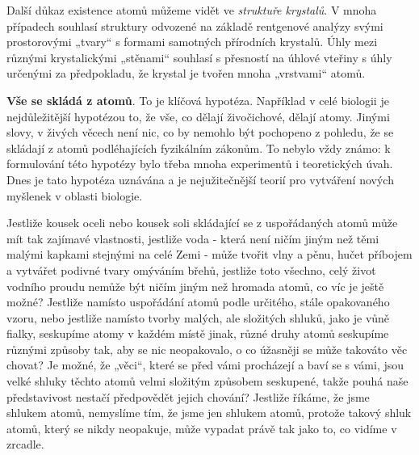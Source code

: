     Další důkaz existence atomů můžeme vidět ve \emph{struktuře krystalů}. V mnoha případech
    souhlasí struktury odvozené na základě rentgenové analýzy svými prostorovými „tvary“ s formami
    samotných přírodních krystalů. Úhly mezi různými krystalickými „stěnami“ souhlasí s přesností na
    úhlové vteřiny s úhly určenými za předpokladu, že krystal je tvořen mnoha „vrstvami“ atomů.
    
    \textbf{Vše se skládá z atomů}. To je klíčová hypotéza. Například v celé biologii je
    nejdůležitější hypotézou to, že vše, co dělají živočichové, dělají atomy. Jinými slovy, v živých
    věcech není nic, co by nemohlo být pochopeno z pohledu, že se skládají z atomů podléhajících
    fyzikálním zákonům. To nebylo vždy známo: k formulování této hypotézy bylo třeba mnoha
    experimentů i teoretických úvah. Dnes je tato hypotéza uznávána a je nejužitečnější teorií pro
    vytváření nových myšlenek v oblasti biologie.
    
    Jestliže kousek oceli nebo kousek soli skládající se z uspořádaných atomů může mít tak zajímavé
    vlastnosti, jestliže voda - která není ničím jiným než těmi malými kapkami stejnými na celé Zemi
    - může tvořit vlny a pěnu, hučet příbojem a vytvářet podivné tvary omýváním břehů, jestliže toto
    všechno, celý život vodního proudu nemůže být ničím jiným než hromada atomů, co víc je ještě
    možné? Jestliže namísto uspořádání atomů podle určitého, stále opakovaného vzoru, nebo jestliže
    namísto tvorby malých, ale složitých shluků, jako je vůně fialky, seskupíme atomy v každém místě
    jinak, různé druhy atomů seskupíme různými způsoby tak, aby se nic neopakovalo, o co úžasněji se
    může takováto věc chovat? Je možné, že „věci“, které se před vámi procházejí a baví se s vámi,
    jsou velké shluky těchto atomů velmi složitým způsobem seskupené, takže pouhá naše představivost
    nestačí předpovědět jejich chování? Jestliže říkáme, že jsme shlukem atomů, nemyslíme tím, že
    jsme jen shlukem atomů, protože takový shluk atomů, který se nikdy neopakuje, může vypadat právě
    tak jako to, co vidíme v zrcadle.

